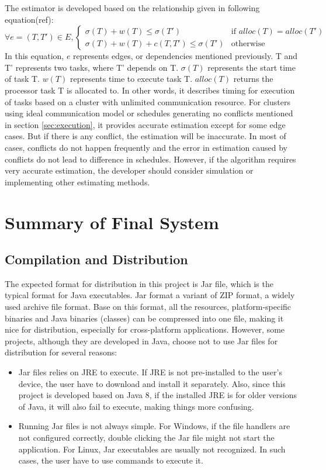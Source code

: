 \documentclass[msc,deptreport, cs]{infthesis}
\begin{document}
The estimator is developed based on the relationship given in following equation(ref):
\begin{equation*}
  \forall e = (T, T') \in E, 
  \begin{cases}
    \sigma (T) + w(T) \leq \sigma(T') & \text{if } alloc(T) = alloc(T')\\
    \sigma (T) + w(T) + c(T, T') \leq \sigma(T')              & \text{otherwise}
\end{cases}
\label{eq:task}
\end{equation*}
In this equation, $e$ represents edges, or dependencies mentioned previously. T and T' represents two tasks, where T' depends on T. $\sigma(T)$ represents the start time of task T. $w(T)$ represents time to execute task T. $alloc(T)$ returns the processor task T is allocated to. In other words, it describes timing for execution of tasks based on a cluster with unlimited communication resource. For clusters using ideal communication model or schedules generating no conflicts mentioned in section \ref{sec:execution}, it provides accurate estimation except for some edge cases. But if there is any conflict, the estimation will be inaccurate. In most of cases, conflicts do not happen frequently and the error in estimation caused by conflicts do not lead to difference in schedules. However, if the algorithm requires very accurate estimation, the developer should consider simulation or implementing other estimating methods.

\chapter{Summary of Final System}

\section{Compilation and Distribution}

The expected format for distribution in this project is Jar file, which is the typical format for Java executables. Jar format a variant of ZIP format, a widely used archive file format. Base on this format, all the resources, platform-specific binaries and Java binaries (classes) can be compressed into one file, making it nice for distribution, especially for cross-platform applications. However, some projects, although they are developed in Java, choose not to use Jar files for distribution for several reasons:
\begin{itemize}
  \item Jar files relies on JRE to execute. If JRE is not pre-installed to the user's device, the user have to download and install it separately. Also, since this project is developed based on Java 8, if the installed JRE is for older versions of Java, it will also fail to execute, making things more confusing.
  \item Running Jar files is not always simple. For Windows, if the file handlers are not configured correctly, double clicking the Jar file might not start the application. For Linux, Jar executables are usually not recognized. In such cases, the user have to use commands to execute it.
\end{itemize}
\end{document}
